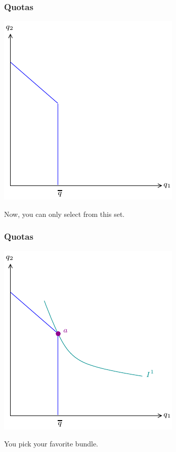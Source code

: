 \documentclass[xcolor=pdftex,dvipsnames]{beamer}
\begin{document}
\begin{frame}
\frametitle{Quotas}
\begin{center}
\includegraphics{pics/Quota3}
\end{center}
Now, you can only select from this set.
\end{frame}

\begin{frame}
\frametitle{Quotas}
\begin{center}
\includegraphics{pics/Quota4}
\end{center}
You pick your favorite bundle.
\end{frame}
\end{document}
